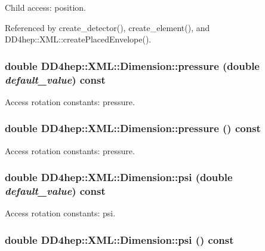 Child access: position. 

Referenced by create\_\-detector(), create\_\-element(), and DD4hep::XML::createPlacedEnvelope().\hypertarget{struct_d_d4hep_1_1_x_m_l_1_1_dimension_a8863708ff8c219c9c364315e53158315}{
\subsubsection[{pressure}]{\setlength{\rightskip}{0pt plus 5cm}double DD4hep::XML::Dimension::pressure (double {\em default\_\-value}) const}}
\label{struct_d_d4hep_1_1_x_m_l_1_1_dimension_a8863708ff8c219c9c364315e53158315}


Access rotation constants: pressure. \hypertarget{struct_d_d4hep_1_1_x_m_l_1_1_dimension_a760be0ff72146dbeb57244adee2d1a6e}{
\subsubsection[{pressure}]{\setlength{\rightskip}{0pt plus 5cm}double DD4hep::XML::Dimension::pressure () const}}
\label{struct_d_d4hep_1_1_x_m_l_1_1_dimension_a760be0ff72146dbeb57244adee2d1a6e}


Access rotation constants: pressure. \hypertarget{struct_d_d4hep_1_1_x_m_l_1_1_dimension_a7b877cfeab02cccb9098c24302ff1dd3}{
\subsubsection[{psi}]{\setlength{\rightskip}{0pt plus 5cm}double DD4hep::XML::Dimension::psi (double {\em default\_\-value}) const}}
\label{struct_d_d4hep_1_1_x_m_l_1_1_dimension_a7b877cfeab02cccb9098c24302ff1dd3}


Access rotation constants: psi. \hypertarget{struct_d_d4hep_1_1_x_m_l_1_1_dimension_aef9defadec0d5575c064ca3d6671ae66}{
\subsubsection[{psi}]{\setlength{\rightskip}{0pt plus 5cm}double DD4hep::XML::Dimension::psi () const}}
\label{struct_d_d4hep_1_1_x_m_l_1_1_dimension_aef9defadec0d5575c064ca3d6671ae66}


